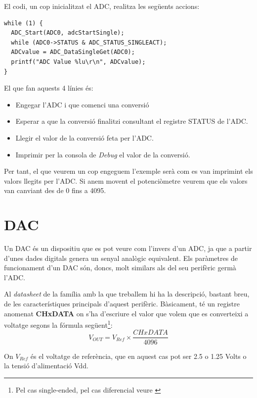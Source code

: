 El codi, un cop inicialitzat el ADC, realitza les següents accions:
\begin{lstlisting}[frame=single,caption={Codi de lectura de l'ADC},style=customc]
while (1) {
  ADC_Start(ADC0, adcStartSingle);
  while (ADC0->STATUS & ADC_STATUS_SINGLEACT);
  ADCvalue = ADC_DataSingleGet(ADC0);
  printf("ADC Value %lu\r\n", ADCvalue);
}
\end{lstlisting}

El que fan aquests 4 línies és:
\begin{itemize}
 \item Engegar l'ADC i que comenci una conversió
 \item Esperar a que la conversió finalitzi consultant el registre STATUS de l'ADC.
 \item Llegir el valor de la conversió feta per l'ADC.
 \item Imprimir per la consola de {\em Debug} el valor de la conversió.
\end{itemize}

Per tant, el que veurem un cop engeguem l'exemple serà com es van imprimint els valors llegits per l'\gls{ADC}. Si anem movent el potenciòmetre veurem que els valors van canviant des de 0 fins a 4095.

\chapter{DAC}
\label{sub:DAC}
Un \gls{DAC} és un dispositiu que es pot veure com l'invers d'un ADC, ja que a partir d'unes dades digitals genera un senyal analògic equivalent. Els paràmetres de funcionament d'un DAC són, doncs, molt similars als del seu perifèric germà l'\gls{ADC}.

Al {\em datasheet} de la família amb la que treballem \cite[421]{EFM32GRM} hi ha la descripció, bastant breu, de les característiques principals d'aquest perifèric. Bàsicament, té un registre anomenat {\bf CHxDATA} on s'ha d'escriure el valor que volem que es converteixi a voltatge segons la fórmula següent\footnote{Pel cas single-ended, pel cas diferencial veure \cite[424]{EFM32GRM}}:
\begin{equation}
\label{eq:DACFormula}
 V_{OUT} = V_{Ref} \times \frac{CHxDATA}{4096}
\end{equation}

On $V_{Ref}$ és el voltatge de referència, que en aquest cas pot ser 2.5 o 1.25 Volts o la tensió d'alimentació Vdd.

